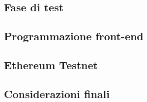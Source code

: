 \subsection{Fase di test}

\subsection{Programmazione front-end}

\subsection{Ethereum Testnet}

\subsection{Considerazioni finali}


